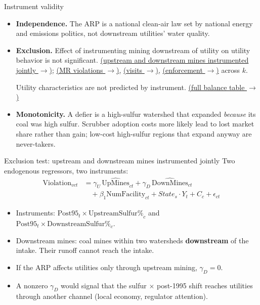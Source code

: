 \documentclass{beamer}
\newcommand{\backuplink}[2]{\hyperlink{#1}{\footnotesize(#2 $\rightarrow$)}}
\begin{document}
\begin{frame}{Instrument validity}
\begin{itemize}\small
    \item \textbf{Independence.} The ARP is a national clean-air law set by national energy and emissions politics, not downstream utilities' water quality.
    \item \textbf{Exclusion.} Effect of instrumenting mining downstream of utility on utility behavior is not significant. \backuplink{updnfs}{upstream and downstream mines instrumented jointly}; \backuplink{kgridmrup}{MR violations}, \backuplink{kgridvisitup}{visits}, \backuplink{kgridenfup}{enforcement} across $k$.

    Utility characteristics are not predicted by instrument. \backuplink{exclfacilities}{full balance table}
    \item \textbf{Monotonicity.} A defier is a high-sulfur watershed that expanded \emph{because} its coal was high sulfur. Scrubber adoption costs more likely lead to lost market share rather than gain; low-cost high-sulfur regions that expand anyway are never-takers. 
\end{itemize}
\end{frame}

\begin{frame}{Exclusion test: upstream and downstream mines instrumented jointly}
Two endogenous regressors, two instruments:
\begin{equation*}
\begin{split}
\text{Violation}_{vct} &= \gamma_U\,\widehat{\text{UpMines}}_{ct} + \gamma_D\,\widehat{\text{DownMines}}_{ct} \\
&\quad + \beta_1\text{NumFacility}_{ct} + State_s \cdot Y_t + C_c + \epsilon_{ct}
\end{split}
\end{equation*}
\begin{itemize}\small
    \item Instruments: $\text{Post95}_t \times \text{UpstreamSulfur\%}_c$ and $\text{Post95}_t \times \text{DownstreamSulfur\%}_c$.
    \item Downstream mines: coal mines within two watersheds \textbf{downstream} of the intake. Their runoff cannot reach the intake.
    \item If the ARP affects utilities only through upstream mining, $\gamma_D = 0$.
    \item A nonzero $\gamma_D$ would signal that the sulfur $\times$ post-1995 shift reaches utilities through another channel (local economy, regulator attention).
\end{itemize}
\end{frame}
\end{document}
